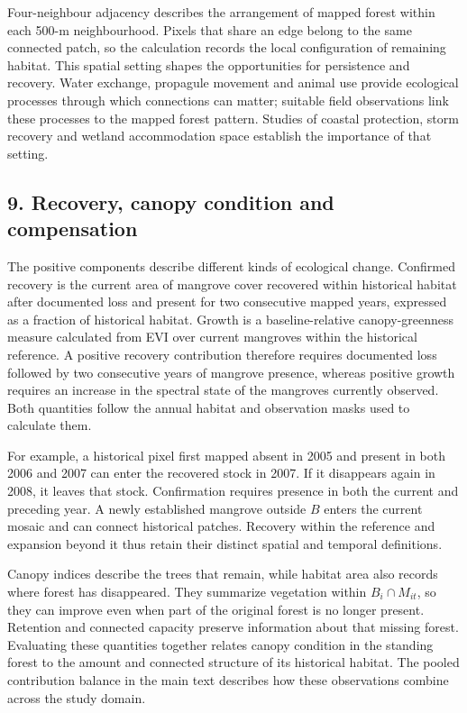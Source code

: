Four-neighbour adjacency describes the arrangement of mapped forest within each 500-m neighbourhood. Pixels that share an edge belong to the same connected patch, so the calculation records the local configuration of remaining habitat. This spatial setting shapes the opportunities for persistence and recovery. Water exchange, propagule movement and animal use provide ecological processes through which connections can matter; suitable field observations link these processes to the mapped forest pattern. Studies of coastal protection, storm recovery and wetland accommodation space establish the importance of that setting\cite{ref011,ref021,ref029}.

\subsection{9. Recovery, canopy condition and compensation}
\label{note:compensation}

The positive components describe different kinds of ecological change. Confirmed recovery is the current area of mangrove cover recovered within historical habitat after documented loss and present for two consecutive mapped years, expressed as a fraction of historical habitat. Growth is a baseline-relative canopy-greenness measure calculated from EVI over current mangroves within the historical reference. A positive recovery contribution therefore requires documented loss followed by two consecutive years of mangrove presence, whereas positive growth requires an increase in the spectral state of the mangroves currently observed. Both quantities follow the annual habitat and observation masks used to calculate them.

For example, a historical pixel first mapped absent in 2005 and present in both 2006 and 2007 can enter the recovered stock in 2007. If it disappears again in 2008, it leaves that stock. Confirmation requires presence in both the current and preceding year. A newly established mangrove outside $B$ enters the current mosaic and can connect historical patches. Recovery within the reference and expansion beyond it thus retain their distinct spatial and temporal definitions. 

Canopy indices describe the trees that remain, while habitat area also records where forest has disappeared. They summarize vegetation within $B_i\cap M_{it}$, so they can improve even when part of the original forest is no longer present. Retention and connected capacity preserve information about that missing forest. Evaluating these quantities together relates canopy condition in the standing forest to the amount and connected structure of its historical habitat. The pooled contribution balance in the main text describes how these observations combine across the study domain.

